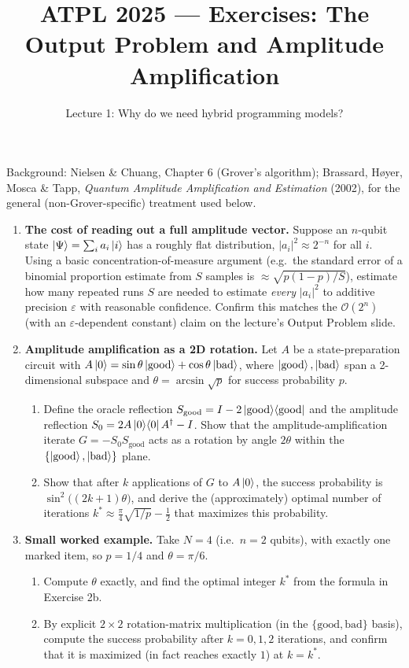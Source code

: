 \documentclass[11pt]{article}
\title{ATPL 2025 --- Exercises: The Output Problem and Amplitude
Amplification}
\author{Lecture 1: Why do we need hybrid programming models?}
\date{}
\begin{document}
\maketitle

Background: Nielsen \& Chuang, Chapter 6 (Grover's algorithm); Brassard,
H{\o}yer, Mosca \& Tapp, \emph{Quantum Amplitude Amplification and
Estimation} (2002), for the general (non-Grover-specific) treatment used
below.

\begin{enumerate}[label=\textbf{Exercise \arabic*.}, leftmargin=2.2cm]

\item \textbf{The cost of reading out a full amplitude vector.}
Suppose an $n$-qubit state $\ket\Psi = \sum_i a_i \ket i$ has a roughly
flat distribution, $|a_i|^2 \approx 2^{-n}$ for all $i$. Using a basic
concentration-of-measure argument (e.g.\ the standard error of a
binomial proportion estimate from $S$ samples is $\approx
\sqrt{p(1-p)/S}$), estimate how many repeated runs $S$ are needed to
estimate \emph{every} $|a_i|^2$ to additive precision $\varepsilon$ with
reasonable confidence. Confirm this matches the $\mathcal O(2^n)$
(with an $\varepsilon$-dependent constant) claim on the lecture's Output
Problem slide.

\item \textbf{Amplitude amplification as a 2D rotation.}
Let $A$ be a state-preparation circuit with
$A\ket0 = \sin\theta\ket{\mathrm{good}} + \cos\theta\ket{\mathrm{bad}}$,
where $\ket{\mathrm{good}},\ket{\mathrm{bad}}$ span a 2-dimensional
subspace and $\theta = \arcsin\sqrt p$ for success probability $p$.
\begin{enumerate}[label=(\alph*)]
\item Define the oracle reflection
$S_{\mathrm{good}} = I - 2\ket{\mathrm{good}}\!\bra{\mathrm{good}}$
and the amplitude reflection
$S_0 = 2A\ket0\!\bra0A^\dagger - I$.
Show that the amplitude-amplification iterate
$G = -S_0 S_{\mathrm{good}}$
acts as a rotation by angle $2\theta$ within the
$\{\ket{\mathrm{good}},\ket{\mathrm{bad}}\}$ plane.
\item Show that after $k$ applications of $G$ to $A\ket0$, the success
probability is $\sin^2\!\big((2k{+}1)\theta\big)$, and derive the
(approximately) optimal number of iterations
$k^\ast \approx \tfrac\pi4\sqrt{1/p} - \tfrac12$
that maximizes this probability.
\end{enumerate}

\item \textbf{Small worked example.}
Take $N=4$ (i.e.\ $n=2$ qubits), with exactly one marked item, so
$p = 1/4$ and $\theta = \pi/6$.
\begin{enumerate}[label=(\alph*)]
\item Compute $\theta$ exactly, and find the optimal integer $k^\ast$
from the formula in Exercise 2b.
\item By explicit $2\times2$ rotation-matrix multiplication (in the
$\{\mathrm{good},\mathrm{bad}\}$ basis), compute the success
probability after $k=0,1,2$ iterations, and confirm that it is maximized
(in fact reaches exactly $1$) at $k=k^\ast$.
\end{enumerate}


\end{enumerate}
\end{document}
